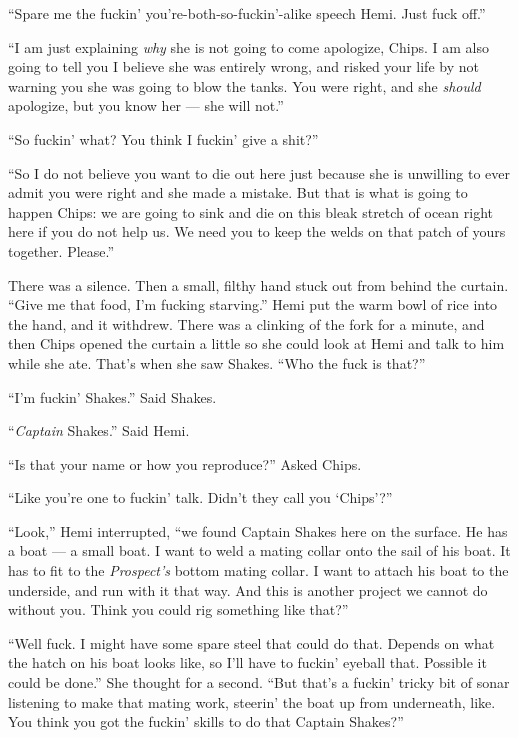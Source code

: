 \documentclass[
]{scrbook}
\begin{document}
``Spare me the fuckin' you're-both-so-fuckin'-alike speech Hemi. Just
fuck off.''

``I am just explaining \emph{why} she is not going to come apologize,
Chips. I am also going to tell you I believe she was entirely wrong, and
risked your life by not warning you she was going to blow the tanks. You
were right, and she \emph{should} apologize, but you know her --- she
will not.''

``So fuckin' what? You think I fuckin' give a shit?''

``So I do not believe you want to die out here just because she is
unwilling to ever admit you were right and she made a mistake. But that
is what is going to happen Chips: we are going to sink and die on this
bleak stretch of ocean right here if you do not help us. We need you to
keep the welds on that patch of yours together. Please.''

There was a silence. Then a small, filthy hand stuck out from behind the
curtain. ``Give me that food, I'm fucking starving.'' Hemi put the warm
bowl of rice into the hand, and it withdrew. There was a clinking of the
fork for a minute, and then Chips opened the curtain a little so she
could look at Hemi and talk to him while she ate. That's when she saw
Shakes. ``Who the fuck is that?''

``I'm fuckin' Shakes.'' Said Shakes.

``\emph{Captain} Shakes.'' Said Hemi.

``Is that your name or how you reproduce?'' Asked Chips.

``Like you're one to fuckin' talk. Didn't they call you `Chips'?''

``Look,'' Hemi interrupted, ``we found Captain Shakes here on the
surface. He has a boat --- a small boat. I want to weld a mating collar
onto the sail of his boat. It has to fit to the \emph{Prospect's} bottom
mating collar. I want to attach his boat to the underside, and run with
it that way. And this is another project we cannot do without you. Think
you could rig something like that?''

``Well fuck. I might have some spare steel that could do that. Depends
on what the hatch on his boat looks like, so I'll have to fuckin'
eyeball that. Possible it could be done.'' She thought for a second.
``But that's a fuckin' tricky bit of sonar listening to make that mating
work, steerin' the boat up from underneath, like. You think you got the
fuckin' skills to do that Captain Shakes?''
\end{document}
